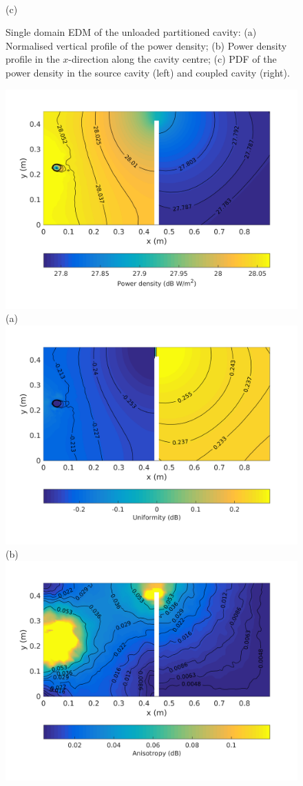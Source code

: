 \documentclass[a4paper]{article}
\numberwithin{equation}{section}
\begin{document}
\begin{figure}[hp]
\begin{center}
\\
{\footnotesize (c)}\\
\vspace{-2mm}
\caption{\label{fg:partemptysdm_profs} Single domain EDM of the unloaded partitioned cavity: (a) Normalised vertical profile of the power density; 
(b) Power density profile in the $x$-direction along the cavity centre; (c) PDF of the power density in the source cavity (left) and coupled cavity (right).}
\end{center}
\end{figure}

\begin{figure}[hp]
\begin{center}
\includegraphics[trim={0 11mm 0 12mm},clip,width=0.52\linewidth]{figures/SDM_3D_DU_PowerDensityMap}\\
{\footnotesize (a)}\\
\vspace{2mm}
\includegraphics[trim={0 11mm 0 12mm},clip,width=0.52\linewidth]{figures/SDM_3D_DU_EnergyDensityUniformityMap}\\
{\footnotesize (b)}\\
\vspace{2mm}
\includegraphics[trim={0 11mm 0 12mm},clip,width=0.52\linewidth]{figures/SDM_3D_DU_EnergyDensityAnisotropyMap}\\

\end{center}
\end{figure}
\end{document}
